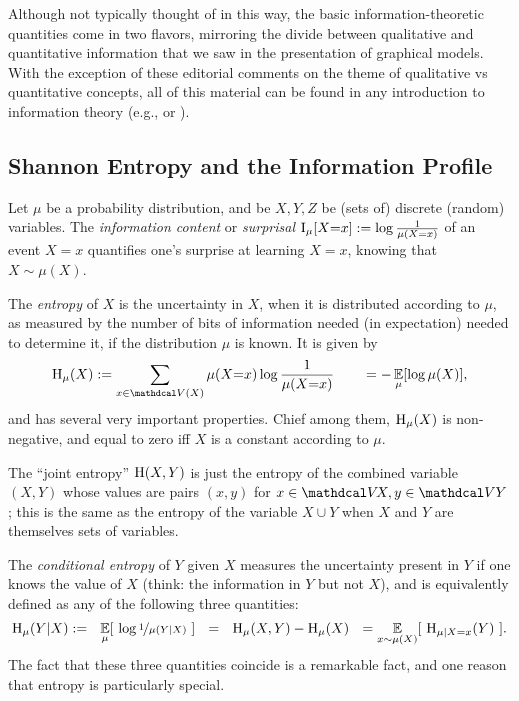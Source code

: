 Although not typically thought of in this way, 
    the basic information-theoretic quantities come in two flavors, mirroring the divide between qualitative and quantitative information that we saw in the presentation of graphical models. 
With the exception of these editorial comments on the theme of qualitative vs quantitative concepts, all of this material can be found in any introduction to information
theory (e.g., \citet[Chapter 1]{mackay2003information} or \citet{CoverThomas}).  

\subsection{Shannon Entropy and the Information Profile}
    \label{sec:qual-info-theory-primer}

Let $\mu$ be a probability distribution, and be $X,Y,Z$
    be (sets of) discrete (random) variables.
The \emph{information content} or \emph{surprisal} $\operatorname{\mathrm{I}}_{\mu}[ X{=}x ] := \log \frac1{\mu(X{=}x)}$ of an event $X{=}x$ quantifies one's surprise at learning $X{=}x$, knowing that $X \sim \mu(X)$.
    
The \emph{entropy} of $X$ is the uncertainty in $X$, when it is distributed according to $\mu$, as measured by the number of bits of information needed (in expectation) needed to determine it, if the distribution $\mu$ is known.  It is given by 
\[
    \H_\mu(X) := \sum_{x \in \V(X)} \mu(X{=}x) \log \frac{1}{\mu(X{=}x)} \qquad= -\Ex_{\mu}[\log \mu(X)],
\]
and has several very important properties. 
Chief among them, $\operatorname{\mathrm{H}}_\mu(X)$ is non-negative, and equal to zero iff $X$ 
    is a constant according to $\mu$. 

The ``joint entropy'' $\operatorname{\mathrm{H}}(X,Y)$ is just the entropy of the combined variable $(X,Y)$ whose values are pairs $(x,y)$ for $x \in \V\!X,y \in \V Y$; this is the same as the entropy of the variable $X \cup Y$ when $X$ and $Y$ are themselves sets of variables. 

The \emph{conditional entropy} of $Y$ given $X$
measures the uncertainty present in $Y$ if one knows the value of $X$
(think: the information in $Y$ but not $X$),
and is equivalently defined as any of the following three quantities:
\[
\operatorname{\mathrm{H}}_\mu( Y | X) :=
    ~~
    \operatorname*{\mathbb{E}}_{\mu} [~\log \nicefrac1{\mu(Y | X)}~]
    ~~=~~\operatorname{\mathrm{H}}_\mu(X,Y) - \operatorname{\mathrm{H}}_\mu(X)
    ~~=\operatorname*{\mathbb{E}}_{x \sim \mu(X)} [~\operatorname{\mathrm{H}}_{\mu \mid X{=}x}(Y)~]    
.
\]
The fact that these three quantities coincide is a remarkable fact,
and one reason that entropy is particularly special. 

